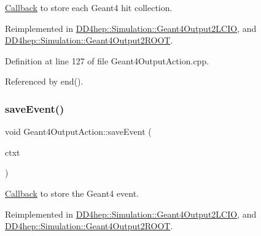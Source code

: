 \hyperlink{class_d_d4hep_1_1_callback}{Callback} to store each Geant4 hit collection. 



Reimplemented in \hyperlink{class_d_d4hep_1_1_simulation_1_1_geant4_output2_l_c_i_o_aeba8f94323098614ee901a3ff0642c73}{D\+D4hep\+::\+Simulation\+::\+Geant4\+Output2\+L\+C\+IO}, and \hyperlink{class_d_d4hep_1_1_simulation_1_1_geant4_output2_r_o_o_t_a1f61031bde79ed84a62145cb32ac4428}{D\+D4hep\+::\+Simulation\+::\+Geant4\+Output2\+R\+O\+OT}.



Definition at line 127 of file Geant4\+Output\+Action.\+cpp.



Referenced by end().

\hypertarget{class_d_d4hep_1_1_simulation_1_1_geant4_output_action_a660080e931d757573839927ca99bfbed}{}\label{class_d_d4hep_1_1_simulation_1_1_geant4_output_action_a660080e931d757573839927ca99bfbed} 
\subsubsection{\texorpdfstring{save\+Event()}{saveEvent()}}
{\footnotesize\ttfamily void Geant4\+Output\+Action\+::save\+Event (\begin{DoxyParamCaption}\item[{\hyperlink{class_d_d4hep_1_1_simulation_1_1_geant4_output_action_1_1_output_context}{Output\+Context}$<$ G4\+Event $>$ \&}]{ctxt }\end{DoxyParamCaption})\hspace{0.3cm}{\ttfamily [virtual]}}



\hyperlink{class_d_d4hep_1_1_callback}{Callback} to store the Geant4 event. 



Reimplemented in \hyperlink{class_d_d4hep_1_1_simulation_1_1_geant4_output2_l_c_i_o_a86749213718dcb1ed4783ab86a374d92}{D\+D4hep\+::\+Simulation\+::\+Geant4\+Output2\+L\+C\+IO}, and \hyperlink{class_d_d4hep_1_1_simulation_1_1_geant4_output2_r_o_o_t_a0562da9b5fdb0f81fa8d14457fd3f319}{D\+D4hep\+::\+Simulation\+::\+Geant4\+Output2\+R\+O\+OT}.



